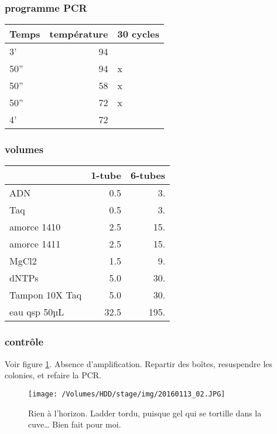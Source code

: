 \documentclass[9pt, oneside, twocolumn]{scrartcl}
\begin{document}
\subsubsection{programme PCR}
\label{sec:orgheadline25}
\begin{center}
\begin{tabular}{lrl}
\toprule
Temps & température & 30 cycles\\
\midrule
3' & 94 & \\
50'' & 94 & x\\
50'' & 58 & x\\
50'' & 72 & x\\
4' & 72 & \\
\bottomrule
\end{tabular}
\end{center}

\subsubsection{volumes}
\label{sec:orgheadline26}
\begin{center}
\begin{tabular}{lrr}
\toprule
 & 1-tube & 6-tubes\\
\midrule
ADN & 0.5 & 3.\\
Taq & 0.5 & 3.\\
amorce 1410 & 2.5 & 15.\\
amorce 1411 & 2.5 & 15.\\
MgCl2 & 1.5 & 9.\\
dNTPs & 5.0 & 30.\\
Tampon 10X Taq & 5.0 & 30.\\
\midrule
eau qsp 50µL & 32.5 & 195.\\
\bottomrule
\end{tabular}
\end{center}

\subsubsection{contrôle}
\label{sec:orgheadline27}
Voir figure \ref{fig:orgparagraph3}. 
Absence d'amplification. Repartir des boîtes, resuspendre les colonies, et
refaire la PCR. 

\begin{figure}[htb]
\centering
\texttt{[image: /Volumes/HDD/stage/img/20160113\_02.JPG]}
\caption{\label{fig:orgparagraph3}
Rien à l'horizon. Ladder tordu, puisque gel qui se tortille dans la cuve… Bien fait pour moi.}
\end{figure}
\end{document}
